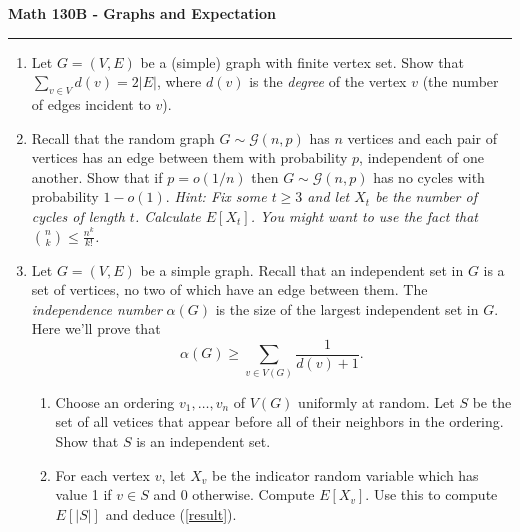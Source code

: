 \documentclass[11pt,letterpaper]{report}
\newcommand{\mcal}[1]{\mathcal{#1}}
\begin{document}
\begin{center}
{\bf \Large Math 130B - Graphs and Expectation}
\vspace{0.2cm}
\hrule
\end{center}

\begin{enumerate}
	\item Let $G = (V, E)$ be a (simple) graph with finite vertex set. Show that $\sum_{v\in V}d(v) = 2|E|$, where $d(v)$ is the \textit{degree} of the vertex $v$ (the number of edges incident to $v$).

	\vfill

	\item Recall that the random graph $G\sim \mcal{G}(n,p)$ has $n$ vertices and each pair of vertices has an edge between them with probability $p$, independent of one another. Show that if $p = o(1/n)$ then $G\sim \mcal{G}(n,p)$ has no cycles with probability $1-o(1)$. \textit{Hint: Fix some $t\geq 3$ and let $X_t$ be the number of cycles of length $t$. Calculate $E[X_t]$. You might want to use the fact that $\binom{n}{k}\leq \frac{n^k}{k!}$.}

	\vfill

	\item Let $G = (V, E)$ be a simple graph. Recall that an independent set in $G$ is a set of vertices, no two of which have an edge between them. The \textit{independence number} $\alpha(G)$ is the size of the largest independent set in $G$. Here we'll prove that
	\begin{equation}\label{result}
		\alpha(G)\geq \sum_{v\in V(G)}\frac{1}{d(v)+1}.
	\end{equation}
	\begin{enumerate}
		\item Choose an ordering $v_1, \ldots, v_n$ of $V(G)$ uniformly at random. Let $S$ be the set of all vetices that appear before all of their neighbors in the ordering. Show that $S$ is an independent set.

		\vfill

		\item For each vertex $v$, let $X_v$ be the indicator random variable which has value 1 if $v\in S$ and 0 otherwise. Compute $E[X_v]$. Use this to compute $E[|S|]$ and deduce (\ref{result}).
	\end{enumerate}
	\vfill
\end{enumerate}
\end{document}
